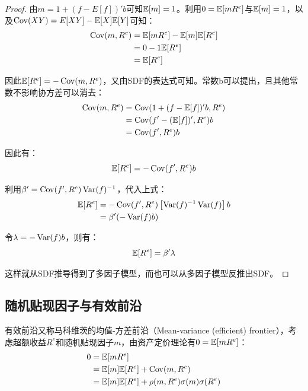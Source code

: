 \documentclass[11pt]{article}
\begin{document}
\begin{proof}
    由$m=1+(f-E[f])'b$可知$\mathbb{E}[m]=1$。利用$0=\mathbb{E}[mR^e]$与$\mathbb{E}[m]=1$，以及$\operatorname{Cov}(XY)=E[XY] -\mathbb{E}[X]\mathbb{E}[Y]$可知：
    \begin{align*}
        \operatorname{Cov}(m,R^e) &= \mathbb{E}[mR^e] - \mathbb{E}[m]\mathbb{E}[R^e] \\
        &= 0 - 1 \mathbb{E}[R^e] \\
        &= \mathbb{E}[R^e]
    \end{align*}

    因此$\mathbb{E}[R^e] = -\operatorname{Cov}(m,R^e)$，又由SDF的表达式可知。常数b可以提出，且其他常数不影响协方差可以消去：
    \begin{align*}
        \operatorname{Cov}(m,R^e) &= \operatorname{Cov}(1+(f-\mathbb{E}[f])'b,R^e) \\
        &= \operatorname{Cov}(f'-(\mathbb{E}[f])',R^e)b \\
        &= \operatorname{Cov}(f',R^e)b
    \end{align*}

    因此有：
    \begin{equation*}
        \mathbb{E}[R^e] = -\operatorname{Cov}(f',R^e)b
    \end{equation*}

    利用$\beta' = \operatorname{Cov}(f',R^e)\operatorname{Var}(f)^{-1}$，代入上式：
    \begin{align*}
        \mathbb{E}[R^e] &= -\operatorname{Cov}(f',R^e)\left[ \operatorname{Var}(f)^{-1} \operatorname{Var}(f) \right]b \\
        &= \beta'(-\operatorname{Var}(f)b)
    \end{align*}

    令$\lambda = -\operatorname{Var}(f)b$，则有：
    \begin{equation*}
        \mathbb{E}[R^e] = \beta' \lambda
    \end{equation*}

    这样就从SDF推导得到了多因子模型，而也可以从多因子模型反推出SDF。
\end{proof}

\subsection{随机贴现因子与有效前沿}

有效前沿又称马科维茨的均值-方差前沿（Mean-variance (efficient) frontier），考虑超额收益$R^e$和随机贴现因子$m$，由资产定价理论有$0=\mathbb{E}[mR^e]$：
\begin{align*}
    0 &= \mathbb{E}[mR^e] \\
    &= \mathbb{E}[m]\mathbb{E}[R^e] + \operatorname{Cov}(m,R^e) \\
    &= \mathbb{E}[m]\mathbb{E}[R^e] + \rho(m,R^e)\sigma(m)\sigma(R^e)
\end{align*}
\end{document}
